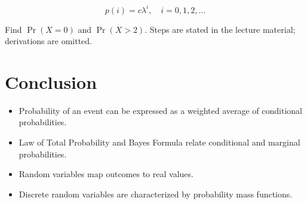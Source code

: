 \documentclass[11pt]{article}
\begin{document}
\[
p(i)=c\lambda^i,\quad i=0,1,2,\dots
\]

Find $\Pr(X=0)$ and $\Pr(X>2)$. Steps are stated in the lecture material; derivations are omitted.

\section*{Conclusion}

\begin{itemize}[leftmargin=1.5em]
\item Probability of an event can be expressed as a weighted average of conditional probabilities.
\item Law of Total Probability and Bayes Formula relate conditional and marginal probabilities.
\item Random variables map outcomes to real values.
\item Discrete random variables are characterized by probability mass functions.
\end{itemize}
\end{document}
